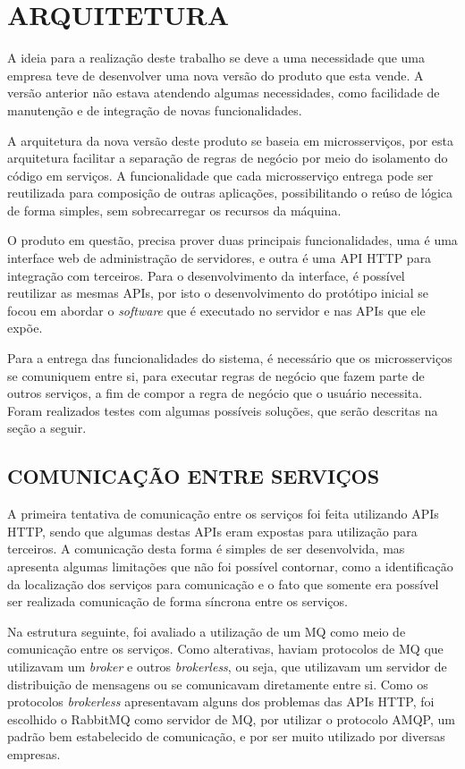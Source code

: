 \chapter{ARQUITETURA}
\label{chp:arquitetura}

A ideia para a realização deste trabalho se deve a uma necessidade que uma
empresa teve de desenvolver uma nova versão do produto que esta vende. A
versão anterior não estava atendendo algumas necessidades, como facilidade
de manutenção e de integração de novas funcionalidades.

A arquitetura da nova versão deste produto se baseia em microsserviços,
por esta arquitetura facilitar a separação de regras de negócio por meio do
isolamento do código em serviços. A funcionalidade que cada microsserviço
entrega pode ser reutilizada para composição de outras aplicações,
possibilitando o reúso de lógica de forma simples, sem sobrecarregar
os recursos da máquina.

O produto em questão, precisa prover duas principais funcionalidades, uma
é uma interface web de administração de servidores, e outra é uma
\ac{API} \ac{HTTP} para integração com terceiros. Para o desenvolvimento da
interface, é possível reutilizar as mesmas \acp{API}, por isto o desenvolvimento
do protótipo inicial se focou em abordar o \emph{software} que é executado no servidor
e nas \acp{API} que ele expõe.

Para a entrega das funcionalidades do sistema, é necessário que os microsserviços
se comuniquem entre si, para executar regras de negócio que fazem parte de outros
serviços, a fim de compor a regra de negócio que o usuário necessita. Foram
realizados testes com algumas possíveis soluções, que serão descritas na seção
a seguir.

\section{COMUNICAÇÃO ENTRE SERVIÇOS}

A primeira tentativa de comunicação entre os serviços foi feita utilizando
\acp{API} \ac{HTTP}, sendo que algumas destas \acp{API} eram expostas para
utilização para terceiros. A comunicação desta forma é simples de ser desenvolvida,
mas apresenta algumas limitações que não foi possível contornar, como a identificação
da localização dos serviços para comunicação e o fato que somente era possível
ser realizada comunicação de forma síncrona entre os serviços.

Na estrutura seguinte, foi avaliado a utilização de um \ac{MQ} como meio de
comunicação entre os serviços. Como alterativas, haviam protocolos de \ac{MQ}
que utilizavam um \emph{broker} e outros \emph{brokerless}, ou seja, que
utilizavam um servidor de distribuição de mensagens ou se comunicavam diretamente
entre si. Como os protocolos \emph{brokerless} apresentavam alguns dos problemas
das \acp{API} \ac{HTTP}, foi escolhido o RabbitMQ como servidor de \ac{MQ},
por utilizar o protocolo \ac{AMQP}, um padrão bem estabelecido de comunicação,
e por ser muito utilizado por diversas empresas.


